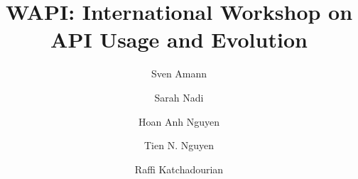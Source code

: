 \documentclass[sigconf]{acmart}
\newcommand{\shortname}{WAPI}
\begin{document}
\title{\shortname{}: International Workshop on API Usage and Evolution}


\newcommand\tud[0]{\textsuperscript{\normalfont \textdagger}}
\newcommand\iowa[0]{\textsuperscript{\normalfont \textparagraph}}
\newcommand\utd[0]{\textsuperscript{\normalfont \ddag}}
\newcommand\lanu[0]{\textsuperscript{\normalfont \textsection}}
\newcommand\ualberta[0]{\textsuperscript{\normalfont \textasteriskcentered}}

\author{Sven Amann}
\author{Sarah Nadi}
\author{Hoan Anh Nguyen}
\author{Tien N. Nguyen}
\author{Raffi Katchadourian}







\end{document}
